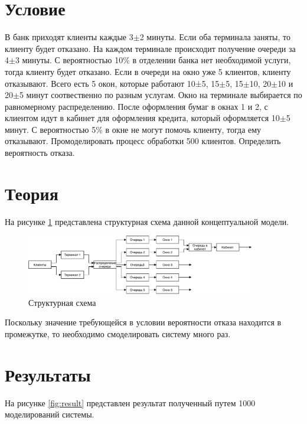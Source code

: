 \section{Условие}

В банк приходят клиенты каждые 3$\pm$2 минуты. Если оба терминала заняты, то клиенту будет отказано. На каждом терминале происходит получение очереди за 4$\pm$3 минуты. С вероятностью 10\% в отделении банка нет необходимой услуги, тогда клиенту будет отказано. Если в очереди на окно уже 5 клиентов, клиенту отказывают. Всего есть 5 окон, которые работают 10±5, 15$\pm$5, 15$\pm$10, 20$\pm$10 и 20$\pm$5 минут соотвественно по разным услугам. Окно на терминале выбирается по равномерному распределению. После оформления бумаг в окнах 1 и 2, с клиентом идут в кабинет для оформления кредита, который оформляется 10$\pm$5 минут. С вероятностью 5\% в окне не могут помочь клиенту, тогда ему отказывают. Промоделировать процесс обработки 500 клиентов. Определить вероятность отказа.

\section{Теория}

На рисунке \ref{fig:model} представлена структурная схема  данной концептуальной модели.

\begin{figure}[H]
    \centering
    \includegraphics[width=0.9\textwidth]{img/content/model.pdf}
    \caption{Структурная схема}
    \label{fig:model}
\end{figure}

Поскольку значение требующейся в условии вероятности отказа находится в промежутке, то необходимо смоделировать систему много раз.

\section{Результаты}

На рисунке \ref{fig:result} представлен результат полученный путем 1000 моделирований системы.


